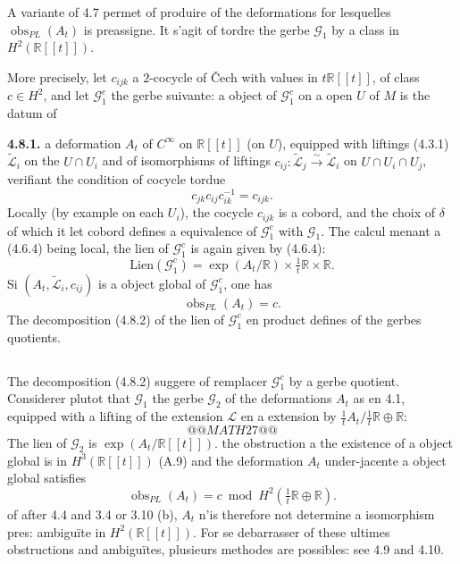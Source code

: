 \documentclass[11pt,a4paper]{article}
\theoremstyle{plain}
\theoremstyle{definition}
\DeclareMathOperator{\obs}{obs}
\newcommand{\R}{\mathbb{R}}
\newcommand{\iso}{\xrightarrow{\sim}}
\begin{document}
A variante of 4.7 permet of produire of the deformations for lesquelles $\obs_{PL}(A_{t})$ is preassigne. It s'agit of tordre the gerbe $\mathcal{G}_{1}$ by a class in $H^{2}(\R[[t]])$.

More precisely, let $c_{ijk}$ a $2$-cocycle of \v{C}ech with values in $t\R[[t]]$, of class $c \in H^{2}$, and let $\mathcal{G}_{1}^{c}$ the gerbe suivante: a object of $\mathcal{G}_{1}^{c}$ on a open $U$ of $M$ is the datum of

\textbf{4.8.1.} a deformation $A_{t}$ of $C^{\infty}$ on $\R[[t]]$ (on $U$), equipped with liftings (4.3.1) $\widetilde{\mathcal{L}}_{i}$ on the $U \cap U_{i}$ and of isomorphisms of liftings $c_{ij}: \widetilde{\mathcal{L}}_{j} \iso \widetilde{\mathcal{L}}_{i}$ on $U \cap U_{i} \cap U_{j}$, verifiant the condition of cocycle tordue
\[
c_{jk} c_{ij} c_{ik}^{-1} = c_{ijk}.
\]
Locally (by example on each $U_{i}$), the cocycle $c_{ijk}$ is a cobord, and the
choix of $\delta$ of which it let cobord defines a equivalence of $\mathcal{G}_{1}^{c}$ with $\mathcal{G}_{1}$. The calcul menant
a (4.6.4) being local, the lien of $\mathcal{G}_{1}^{c}$ is again given by (4.6.4):
\begin{equation}
\text{Lien}(\mathcal{G}_{1}^{c}) = \exp(A_{t}/\R) \times \tfrac{1}{t}\R \times \R. \tag{4.8.2}
\end{equation}
Si $(A_{t}, \widetilde{\mathcal{L}}_{i}, c_{ij})$ is a object global of $\mathcal{G}_{1}^{c}$, one has
\begin{equation}
\obs_{PL}(A_{t}) = c. \tag{4.8.3}
\end{equation}
The decomposition (4.8.2) of the lien of $\mathcal{G}_{1}^{c}$ en product defines of the gerbes quotients.

\subsection{}
The decomposition (4.8.2) suggere of remplacer $\mathcal{G}_{1}^{c}$ by a gerbe quotient. Considerer plutot that $\mathcal{G}_{1}$ the gerbe $\mathcal{G}_{2}$ of the deformations $A_{t}$ as en 4.1, equipped with a lifting of the extension $\mathcal{L}$ en a extension by $\tfrac{1}{t}A_{t}/\tfrac{1}{t}\R \oplus \R$:
\[
@@MATH27@@ \tag{4.8.4}
\]
The lien of $\mathcal{G}_{2}$ is $\exp(A_{t}/\R[[t]])$. the obstruction a the existence of a object global is in $H^{3}(\R[[t]])$ (A.9) and the deformation $A_{t}$ under-jacente a object global satisfies
\[
\obs_{PL}(A_{t}) = c \bmod H^{2}(\tfrac{1}{t}\R \oplus \R).
\]
of after 4.4 and 3.4 or 3.10 (b), $A_{t}$ n'is therefore not determine a isomorphism pres: ambigu\"ite in $H^{2}(\R[[t]])$. For se debarrasser of these ultimes obstructions and ambigu\"ites, plusieurs methodes are possibles: see 4.9 and 4.10.
\end{document}
